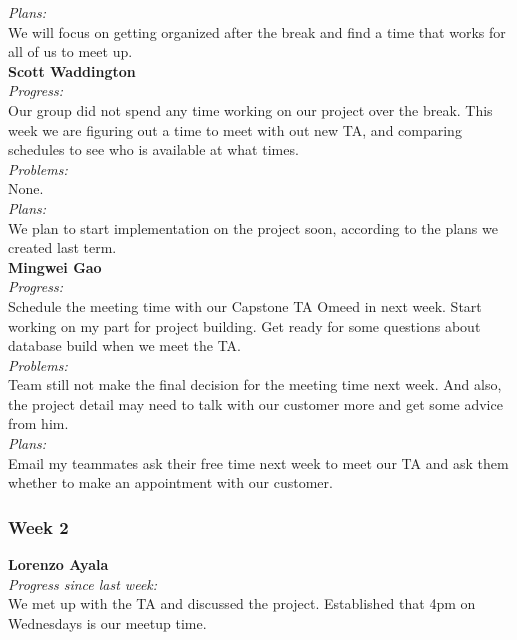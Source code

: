 \noindent\textit{Plans:}\\
\noindent We will focus on getting organized after the break and find a time that works for all of us to meet up.\\

\noindent\textbf{Scott Waddington}\\
\noindent\textit{Progress:}\\
Our group did not spend any time working on our project over the break. This week we are figuring out a time to meet with out new TA, and comparing schedules to see who is available at what times.\\

\noindent\textit{Problems:}\\
\noindent None.\\

\noindent\textit{Plans:}\\
\noindent We plan to start implementation on the project soon, according to the plans we created last term.\\

\noindent\textbf{Mingwei Gao}\\
\noindent\textit{Progress:}\\
Schedule the meeting time with our Capstone TA Omeed in next week. Start working on my part for project building. Get ready for some questions about database build when we meet the TA.\\

\noindent\textit{Problems:}\\
\noindent Team still not make the final decision for the meeting time next week. And also, the project detail may need to talk with our customer more and get some advice from him.\\

\noindent\textit{Plans:}\\
\noindent  Email my teammates ask their free time next week to meet our TA and ask them whether to make an appointment with our customer.\\


\subsubsection{Week 2}

\textbf{Lorenzo Ayala}\\
\noindent\textit{Progress since last week:}\\
We met up with the TA and discussed the project. Established that 4pm on Wednesdays is our meetup time.\\

